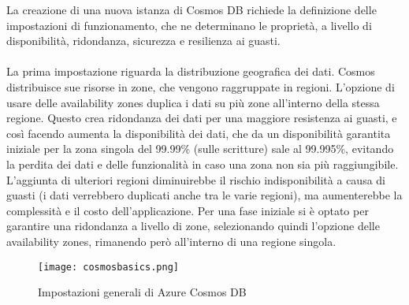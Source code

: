 La creazione di una nuova istanza di Cosmos DB
richiede la definizione delle impostazioni di funzionamento,
che ne determinano le proprietà, a livello di disponibilità, ridondanza, sicurezza e resilienza ai guasti.\\
\\
La prima impostazione riguarda la distribuzione geografica dei dati.
Cosmos distribuisce sue risorse in zone, che vengono raggruppate in regioni.
L'opzione di usare delle availability zones duplica i dati su più zone all'interno della stessa regione.
Questo crea ridondanza dei dati per una maggiore resistenza ai guasti,
e così facendo aumenta la disponibilità dei dati, 
che da un disponibilità garantita iniziale per la zona singola del 99.99\% (sulle scritture) sale al 99.995\%,
evitando la perdita dei dati e delle funzionalità in caso una zona non sia più raggiungibile.
L'aggiunta di ulteriori regioni diminuirebbe il rischio indisponibilità a causa di guasti
(i dati verrebbero duplicati anche tra le varie regioni),
ma aumenterebbe la complessità e il costo dell'applicazione.
Per una fase iniziale si è optato per garantire una ridondanza a livello di zone,
selezionando quindi l'opzione delle availability zones, 
rimanendo però all'interno di una regione singola.\\

\begin{figure}[h!]
    \centering
    \texttt{[image: cosmosbasics.png]}
    \caption{Impostazioni generali di Azure Cosmos DB}
\end{figure}

